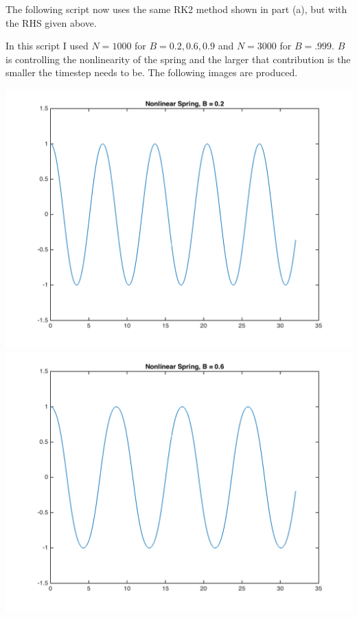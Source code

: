 \documentclass[11pt, oneside]{article}
\begin{document}
\begin{enumerate}
      The following script now uses the same RK2 method shown in part (a), but with the RHS given
      above.
      
      In this script I used $N = 1000$ for $B = 0.2, 0.6, 0.9$ and $N = 3000$ for
      $B = .999$.
      $B$ is controlling the nonlinearity of the spring and the larger that
      contribution is the smaller the timestep needs to be.
      The following images are produced.
      \begin{center}
        \includegraphics[scale=.4]{Figures/01_11.png}
        \includegraphics[scale=.4]{Figures/01_12.png}

\end{center}
\end{enumerate}
\end{document}
